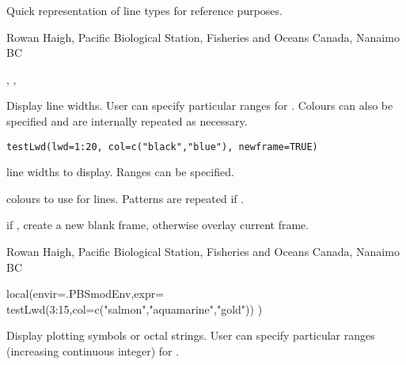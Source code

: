 \documentclass[letterpaper]{book}
\begin{document}
%
\begin{Note}\relax
Quick representation of line types for reference purposes.
\end{Note}
%
\begin{Author}\relax
Rowan Haigh, Pacific Biological Station, Fisheries and Oceans Canada, Nanaimo BC
\end{Author}
%
\begin{SeeAlso}\relax
{}, , 
\end{SeeAlso}
%
\begin{Description}\relax
Display line widths. User can specify particular ranges for . 
Colours can also be specified and are internally repeated as necessary.
\end{Description}
%
\begin{Usage}
\begin{verbatim}
testLwd(lwd=1:20, col=c("black","blue"), newframe=TRUE)
\end{verbatim}
\end{Usage}
%
\begin{Arguments}
\begin{ldescription}
\item[\code{lwd}] line widths to display. Ranges can be specified.
\item[\code{col}] colours to use for lines. Patterns are repeated if 
.
\item[\code{newframe}] if , create a new blank frame, otherwise overlay current frame.
\end{ldescription}
\end{Arguments}
%
\begin{Author}\relax
Rowan Haigh, Pacific Biological Station, Fisheries and Oceans Canada, Nanaimo BC
\end{Author}
%
\begin{Examples}
\begin{ExampleCode}
local(envir=.PBSmodEnv,expr={
  testLwd(3:15,col=c("salmon","aquamarine","gold"))
})
\end{ExampleCode}
\end{Examples}
%
\begin{Description}\relax
Display plotting symbols or octal strings. 
User can specify particular ranges (increasing continuous integer) for .
\end{Description}
\end{document}
